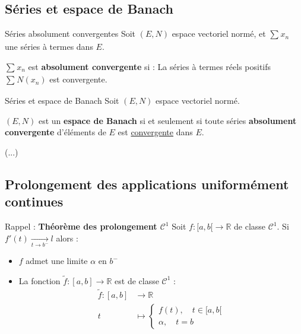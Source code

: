 \subsection{Séries et espace de Banach} %
\label{sub:Séries et espace de Banach}


\begin{Definition}[colbacktitle=red!75!black]{Séries absolument convergentes}{}
Soit $(E,N)$ espace vectoriel normé, et $\sum_{}^{}x_n$ une séries à termes dans $E$.

$\sum_{}^{}x_n$ est \textbf{absolument convergente} si :
\center 
La séries à termes réels positifs $\sum_{}^{} N(x_n)$ est convergente.
\end{Definition}

\begin{Theorem}{Séries et espace de Banach}{}
Soit $(E, N)$ espace vectoriel normé. 

\center 
$(E,N)$ est un \textbf{espace de Banach} si et seulement si toute séries \textbf{absolument convergente} d'éléments de $E$ est \underline{convergente} dans $E$.
\end{Theorem}


\begin{myproof}{}{}
  (...)
\end{myproof}




\subsection{Prolongement des applications uniformément continues}

Rappel : \textbf{Théorème des prolongement $\mathcal{C} ^{1}$}
Soit $f : [a, b[ \to \mathbb{R}$ de classe $\mathcal{C} ^{1}$.  Si $f'(t)  \underset{t \to b ^{-}}{\longrightarrow} l$ alors : 
\begin{itemize}

    \item $f$ admet une limite $\alpha$ en $b ^{-}$ 
    \item La fonction $\widetilde{f} : [a,b] \to \mathbb{R}$ est de classe $\mathcal{C} ^{1}$ :
      \begin{align*}
        \widetilde{f} : [a,b] &\to \mathbb{R} \\ 
        t &\mapsto \begin{cases}
          f(t), \quad t \in [a,b[ \\ 
          \alpha, \quad t = b
        \end{cases}
      \end{align*}

\end{itemize}

